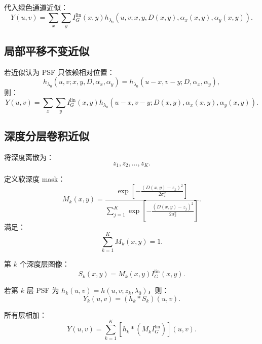 \documentclass[11pt,a4paper,fontset=none]{ctexart}
\begin{document}
代入绿色通道近似：
\begin{equation}
\boxed{
  Y(u,v)
  =
  \sum_x\sum_y
  I_G^{\mathrm{lin}}(x,y)
  h_{\lambda_0}
  \left(
  u,v;
  x,y,
  D(x,y),
  \alpha_x(x,y),
  \alpha_y(x,y)
  \right).
}
\end{equation}

\subsection{局部平移不变近似}

若近似认为 PSF 只依赖相对位置：
\begin{equation}
  h_{\lambda_0}(u,v;x,y,D,\alpha_x,\alpha_y)
  =
  h_{\lambda_0}(u-x,v-y;D,\alpha_x,\alpha_y),
\end{equation}
则：
\begin{equation}
  Y(u,v)
  =
  \sum_x\sum_y
  I_G^{\mathrm{lin}}(x,y)
  h_{\lambda_0}
  \left(
  u-x,v-y;
  D(x,y),
  \alpha_x(x,y),
  \alpha_y(x,y)
  \right).
\end{equation}

\subsection{深度分层卷积近似}

将深度离散为：
\begin{equation}
  z_1,z_2,\ldots,z_K.
\end{equation}

定义软深度 mask：
\begin{equation}
  M_k(x,y)
  =
  \frac{
  \exp\left[-\frac{(D(x,y)-z_k)^2}{2\sigma_z^2}\right]
  }{
  \sum_{j=1}^{K}
  \exp\left[-\frac{(D(x,y)-z_j)^2}{2\sigma_z^2}\right]
  }.
\end{equation}
满足：
\begin{equation}
  \sum_{k=1}^{K}M_k(x,y)=1.
\end{equation}

第 $k$ 个深度层图像：
\begin{equation}
  S_k(x,y)=M_k(x,y)I_G^{\mathrm{lin}}(x,y).
\end{equation}

若第 $k$ 层 PSF 为 $h_k(u,v)=h(u,v;z_k,\lambda_0)$，则：
\begin{equation}
  Y_k(u,v)=(h_k*S_k)(u,v).
\end{equation}

所有层相加：
\begin{equation}
\boxed{
  Y(u,v)
  =
  \sum_{k=1}^{K}
  \left[
  h_k*
  \left(
  M_k I_G^{\mathrm{lin}}
  \right)
  \right](u,v).
}
\end{equation}
\end{document}

